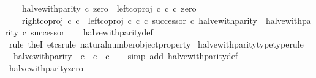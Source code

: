\begin{isabellebody}
\ \ \ \ halve{\isacharunderscore}{\kern0pt}with{\isacharunderscore}{\kern0pt}parity\ {\isasymcirc}\isactrlsub c\ zero\ {\isacharequal}{\kern0pt}\ left{\isacharunderscore}{\kern0pt}coproj\ {\isasymnat}\isactrlsub c\ {\isasymnat}\isactrlsub c\ {\isasymcirc}\isactrlsub c\ zero\ {\isasymand}\isanewline
\ \ \ \ {\isacharparenleft}{\kern0pt}right{\isacharunderscore}{\kern0pt}coproj\ {\isasymnat}\isactrlsub c\ {\isasymnat}\isactrlsub c\ {\isasymamalg}\ {\isacharparenleft}{\kern0pt}left{\isacharunderscore}{\kern0pt}coproj\ {\isasymnat}\isactrlsub c\ {\isasymnat}\isactrlsub c\ {\isasymcirc}\isactrlsub c\ successor{\isacharparenright}{\kern0pt}{\isacharparenright}{\kern0pt}\ {\isasymcirc}\isactrlsub c\ halve{\isacharunderscore}{\kern0pt}with{\isacharunderscore}{\kern0pt}parity\ {\isacharequal}{\kern0pt}\ halve{\isacharunderscore}{\kern0pt}with{\isacharunderscore}{\kern0pt}parity\ {\isasymcirc}\isactrlsub c\ successor{\isachardoublequoteclose}\isanewline
%
\isadelimproof
\ \ %
\endisadelimproof
%
\isatagproof
{}\isamarkupfalse%
\ halve{\isacharunderscore}{\kern0pt}with{\isacharunderscore}{\kern0pt}parity{\isacharunderscore}{\kern0pt}def\ \isamarkupfalse%
\ {\isacharparenleft}{\kern0pt}rule\ theI{\isacharprime}{\kern0pt}{\isacharcomma}{\kern0pt}\ etcs{\isacharunderscore}{\kern0pt}rule\ natural{\isacharunderscore}{\kern0pt}number{\isacharunderscore}{\kern0pt}object{\isacharunderscore}{\kern0pt}property{}{\isacharparenright}{\kern0pt}%
\endisatagproof
{\isafoldproof}%
%
\isadelimproof
\isanewline
%
\endisadelimproof
\isanewline
{}\isamarkupfalse%
\ halve{\isacharunderscore}{\kern0pt}with{\isacharunderscore}{\kern0pt}parity{\isacharunderscore}{\kern0pt}type{\isacharbrackleft}{\kern0pt}type{\isacharunderscore}{\kern0pt}rule{\isacharbrackright}{\kern0pt}{\isacharcolon}{\kern0pt}\isanewline
\ \ {\isachardoublequoteopen}halve{\isacharunderscore}{\kern0pt}with{\isacharunderscore}{\kern0pt}parity\ {\isacharcolon}{\kern0pt}\ {\isasymnat}\isactrlsub c\ {\isasymrightarrow}\ {\isasymnat}\isactrlsub c\ {\isasymCoprod}\ {\isasymnat}\isactrlsub c{\isachardoublequoteclose}\isanewline
%
\isadelimproof
\ \ %
\endisadelimproof
%
\isatagproof
{}\isamarkupfalse%
\ {\isacharparenleft}{\kern0pt}simp\ add{\isacharcolon}{\kern0pt}\ halve{\isacharunderscore}{\kern0pt}with{\isacharunderscore}{\kern0pt}parity{\isacharunderscore}{\kern0pt}def{}{\isacharparenright}{\kern0pt}%
\endisatagproof
{\isafoldproof}%
%
\isadelimproof
\isanewline
%
\endisadelimproof
\isanewline
{}\isamarkupfalse%
\ halve{\isacharunderscore}{\kern0pt}with{\isacharunderscore}{\kern0pt}parity{\isacharunderscore}{\kern0pt}zero{\isacharcolon}{\kern0pt}\isanewline

\end{isabellebody}
